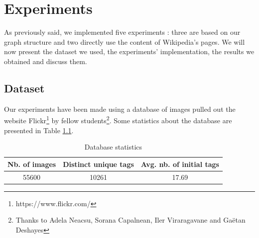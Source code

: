 
\chapter{Experiments} %

\label{chapter:Experiments} %

As previously said, we implemented five experiments : three are based on our graph structure and two directly use the content of Wikipedia's pages. We will now present the dataset we used, the experiments' implementation, the results we obtained and discuss them.

\section{Dataset} %
\label{sec:dataset}
Our experiments have been made using a database of images pulled out the website Flickr\footnote{https://www.flickr.com/} by fellow students\footnote{Thanks to Adela Neacsu, Sorana Capalnean, Iler Viraragavane and Gaëtan Deshayes}. Some statistics about the database are presented in Table \ref{table:db_stats}.\\
\begin{table}[!h]
\centering
\begin{tabular}{|c|c|c|}
\hline
{\bf Nb. of images} & {\bf Distinct unique tags} & {\bf Avg. nb. of initial tags} \\ \hline
55600               & 10261                      & 17.69                          \\ \hline
\end{tabular}
\caption{Database statistics}
\label{table:db_stats}
\end{table}

\newpage


